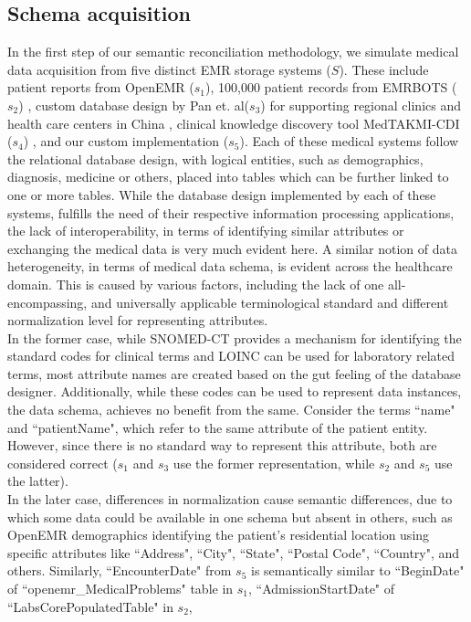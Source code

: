 \subsection*{Schema acquisition}
\label{schema_acq}
In the first step of our semantic reconciliation methodology, we simulate medical data acquisition from five distinct EMR storage systems ($S$). These include patient reports from OpenEMR ($s_1$), 100,000 patient records from EMRBOTS ($s_2$) \cite{kartoun2016methodology}, custom database design by Pan et. al($s_3$) for supporting regional clinics and health care centers in China \cite{pan2016design}, clinical knowledge discovery tool MedTAKMI-CDI ($s_4$) \cite{inokuchi2007medtakmi}, and our custom implementation ($s_5$). Each of these medical systems follow the relational database design, with logical entities, such as demographics, diagnosis, medicine or others, placed into tables which can be further linked to one or more tables. While the database design implemented by each of these systems, fulfills the need of their respective information processing applications, the lack of interoperability, in terms of identifying similar attributes or exchanging the medical data is very much evident here. 
A similar notion of data heterogeneity, in terms of medical data schema, is evident across the healthcare domain. This is caused by various factors, including the lack of one all-encompassing, and universally applicable terminological standard and different normalization level for representing attributes.\\
In the former case, while SNOMED-CT provides a mechanism for identifying the standard codes for clinical terms and LOINC can be used for laboratory related terms, most attribute names are created based on the gut feeling of the database designer. Additionally, while these codes can be used to represent data instances, the data schema, achieves no benefit from the same.  Consider the terms ``name" and ``patientName", which refer to the same attribute of the patient entity.  However, since there is no standard way to represent this attribute, both are considered correct ($s_1$ and $s_3$ use the former representation, while $s_2$ and $s_5$ use the latter).\\
In the later case, differences in normalization cause semantic differences, due to which some data could be available in one schema but absent in others, such as OpenEMR demographics identifying the patient's residential location using specific attributes like ``Address", ``City", ``State", ``Postal Code", ``Country", and others. Similarly, ``EncounterDate" from $s_5$ is semantically similar to ``BeginDate" of ``openemr\_MedicalProblems" table in $s_1$, ``AdmissionStartDate" of ``LabsCorePopulatedTable" in $s_2$, 

